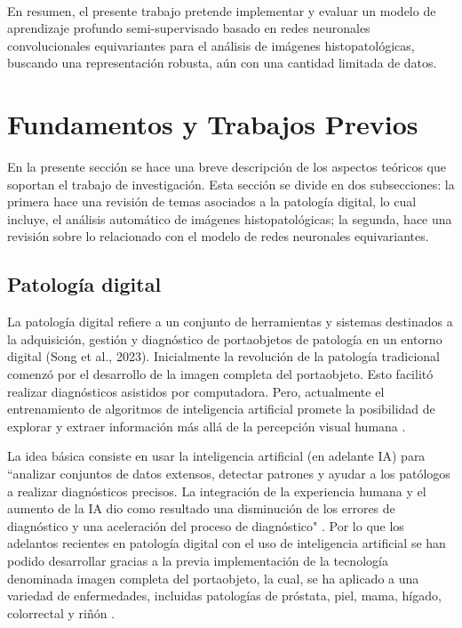 \documentclass[12pt,letterpaper,final, openany]{scrbook}
\begin{document}
\\
En resumen, el presente trabajo pretende implementar y evaluar un modelo de aprendizaje profundo semi-supervisado basado en redes neuronales convolucionales equivariantes para el análisis de imágenes histopatológicas, buscando una representación robusta, aún con una cantidad limitada de datos.
\newpage
\chapter{Fundamentos y Trabajos Previos}


En la presente sección se hace una breve descripción de los aspectos teóricos que soportan el trabajo de investigación. Esta sección se divide en dos subsecciones: la primera hace una revisión de temas asociados a la patología digital, lo cual incluye, el análisis automático de imágenes histopatológicas; la segunda, hace una revisión sobre lo relacionado con el modelo de redes neuronales equivariantes.

\section{Patología digital}

La patología digital refiere a un conjunto de herramientas y sistemas destinados a la adquisición, gestión y diagnóstico de portaobjetos de patología en un entorno digital (Song et al., 2023)\cite{song_artificial_2023}. Inicialmente la revolución de la patología tradicional comenzó por el desarrollo de la imagen completa del portaobjeto. Esto facilitó realizar diagnósticos asistidos por computadora. Pero, actualmente el entrenamiento de algoritmos de inteligencia artificial promete la posibilidad de explorar y extraer información más allá de la percepción visual humana \cite{baxi_digital_2022}.

La idea básica consiste en usar la inteligencia artificial (en adelante IA) para ``analizar conjuntos de datos extensos, detectar patrones y ayudar a los patólogos a realizar diagnósticos precisos. La integración de la experiencia humana y el aumento de la IA dio como resultado una disminución de los errores de diagnóstico y una aceleración del proceso de diagnóstico" \cite{kiran_digital_nodate}. Por lo que los adelantos recientes en patología digital con el uso de inteligencia artificial se han podido desarrollar gracias a la previa implementación de la tecnología denominada imagen completa del portaobjeto, la cual, se ha aplicado a una variedad de enfermedades, incluidas patologías de próstata, piel, mama, hígado, colorrectal y riñón \cite{mcgenity_navigating_2023}.
\end{document}
